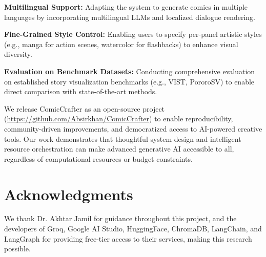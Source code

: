 \documentclass[runningheads]{llncs}
\begin{document}
\textbf{Multilingual Support:} Adapting the system to generate comics in multiple languages by incorporating multilingual LLMs and localized dialogue rendering.

\textbf{Fine-Grained Style Control:} Enabling users to specify per-panel artistic styles (e.g., manga for action scenes, watercolor for flashbacks) to enhance visual diversity.

\textbf{Evaluation on Benchmark Datasets:} Conducting comprehensive evaluation on established story visualization benchmarks (e.g., VIST, PororoSV) to enable direct comparison with state-of-the-art methods.

We release ComicCrafter as an open-source project (\url{https://github.com/Absirkhan/ComicCrafter}) to enable reproducibility, community-driven improvements, and democratized access to AI-powered creative tools. Our work demonstrates that thoughtful system design and intelligent resource orchestration can make advanced generative AI accessible to all, regardless of computational resources or budget constraints.

\section*{Acknowledgments}

We thank Dr. Akhtar Jamil for guidance throughout this project, and the developers of Groq, Google AI Studio, HuggingFace, ChromaDB, LangChain, and LangGraph for providing free-tier access to their services, making this research possible.
\end{document}
